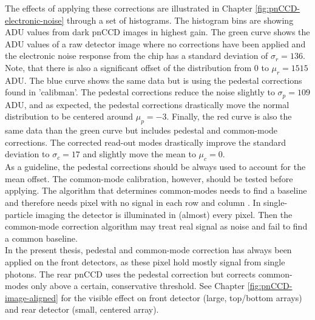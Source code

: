 %
The effects of applying these corrections are illustrated in Chapter \ref{fig:pnCCD-electronic-noise} through a set of histograms. The histogram bins are showing ADU values from dark pnCCD images in highest gain. The green curve shows the ADU values of a raw detector image where no corrections have been applied and the electronic noise response from the chip has a standard deviation of $\sigma_{r}=136$. Note, that there is also a significant offset of the distribution from 0 to $\mu_{r}=1515$ ADU. The blue curve shows the same data but is using the pedestal corrections found in 'calibman'. The pedestal corrections reduce the noise slightly to $\sigma_{p}=109$ ADU, and as expected, the pedestal corrections drastically move the normal distribution to be centered around $\mu_{p}=-3$. Finally, the red curve is also the same data than the green curve but includes pedestal and common-mode corrections. The corrected read-out modes drastically improve the standard deviation to $\sigma_{c}=17$ and slightly move the mean to $\mu_{c}=0$.\\
As a guideline, the pedestal corrections should be always used to account for the mean offset. The common-mode calibration, however, should be tested before applying. The algorithm that determines common-modes needs to find a baseline and therefore needs pixel with no signal in each row and column  \citep{Hantke-Foucard-2016-PC}. In single-particle imaging the detector is illuminated in (almost) every pixel. Then the common-mode correction algorithm may treat real signal as noise and fail to find a common baseline.\\
In the present thesis, pedestal and common-mode correction has always been applied on the front detectors, as these pixel hold mostly signal from single photons. The rear pnCCD uses the pedestal correction but corrects common-modes only above a certain, conservative threshold. See Chapter \ref{fig:pnCCD-image-aligned} for the visible effect on front detector (large, top/bottom arrays) and rear detector (small, centered array).\\
%
%
%
%
%
%
